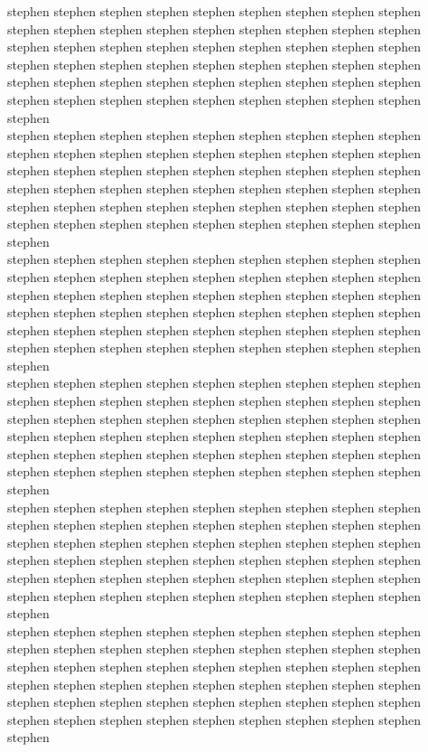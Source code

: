 stephen stephen stephen stephen stephen stephen stephen stephen stephen stephen stephen stephen stephen stephen stephen stephen stephen stephen stephen stephen stephen stephen stephen stephen stephen stephen stephen stephen stephen stephen stephen stephen stephen stephen stephen stephen stephen stephen stephen stephen stephen stephen stephen stephen stephen stephen stephen stephen stephen stephen stephen stephen stephen stephen stephen\\
stephen stephen stephen stephen stephen stephen stephen stephen stephen stephen stephen stephen stephen stephen stephen stephen stephen stephen stephen stephen stephen stephen stephen stephen stephen stephen stephen stephen stephen stephen stephen stephen stephen stephen stephen stephen stephen stephen stephen stephen stephen stephen stephen stephen stephen stephen stephen stephen stephen stephen stephen stephen stephen stephen stephen\\
stephen stephen stephen stephen stephen stephen stephen stephen stephen stephen stephen stephen stephen stephen stephen stephen stephen stephen stephen stephen stephen stephen stephen stephen stephen stephen stephen stephen stephen stephen stephen stephen stephen stephen stephen stephen stephen stephen stephen stephen stephen stephen stephen stephen stephen stephen stephen stephen stephen stephen stephen stephen stephen stephen stephen\\
stephen stephen stephen stephen stephen stephen stephen stephen stephen stephen stephen stephen stephen stephen stephen stephen stephen stephen stephen stephen stephen stephen stephen stephen stephen stephen stephen stephen stephen stephen stephen stephen stephen stephen stephen stephen stephen stephen stephen stephen stephen stephen stephen stephen stephen stephen stephen stephen stephen stephen stephen stephen stephen stephen stephen\\
stephen stephen stephen stephen stephen stephen stephen stephen stephen stephen stephen stephen stephen stephen stephen stephen stephen stephen stephen stephen stephen stephen stephen stephen stephen stephen stephen stephen stephen stephen stephen stephen stephen stephen stephen stephen stephen stephen stephen stephen stephen stephen stephen stephen stephen stephen stephen stephen stephen stephen stephen stephen stephen stephen stephen\\
stephen stephen stephen stephen stephen stephen stephen stephen stephen stephen stephen stephen stephen stephen stephen stephen stephen stephen stephen stephen stephen stephen stephen stephen stephen stephen stephen stephen stephen stephen stephen stephen stephen stephen stephen stephen stephen stephen stephen stephen stephen stephen stephen stephen stephen stephen stephen stephen stephen stephen stephen stephen stephen stephen stephen\\
